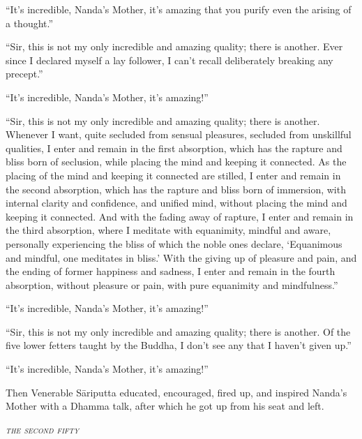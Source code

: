 \documentclass[12pt,openany]{book}%
\let\oldcontentsline\contentsline
\newcommand{\nopagecontentsline}[3]{\oldcontentsline{#1}{#2}{}}
\newcommand*{\pannasa}[1]{\clearpage\thispagestyle{empty}\begin{center}\vspace*{14em}\setstretch{.85}\huge\itshape\scshape\MakeLowercase{#1}\end{center}}
\begin{document}
“It’s incredible, Nanda’s Mother, it’s amazing that you purify even the arising of a thought.” 

“Sir, this is not my only incredible and amazing quality; there is another. Ever since I declared myself a lay follower, I can’t recall deliberately breaking any precept.” 

“It’s incredible, Nanda’s Mother, it’s amazing!” 

“Sir, this is not my only incredible and amazing quality; there is another. Whenever I want, quite secluded from sensual pleasures, secluded from unskillful qualities, I enter and remain in the first absorption, which has the rapture and bliss born of seclusion, while placing the mind and keeping it connected. As the placing of the mind and keeping it connected are stilled, I enter and remain in the second absorption, which has the rapture and bliss born of immersion, with internal clarity and confidence, and unified mind, without placing the mind and keeping it connected. And with the fading away of rapture, I enter and remain in the third absorption, where I meditate with equanimity, mindful and aware, personally experiencing the bliss of which the noble ones declare, ‘Equanimous and mindful, one meditates in bliss.’ With the giving up of pleasure and pain, and the ending of former happiness and sadness, I enter and remain in the fourth absorption, without pleasure or pain, with pure equanimity and mindfulness.” 

“It’s incredible, Nanda’s Mother, it’s amazing!” 

“Sir, this is not my only incredible and amazing quality; there is another. Of the five lower fetters taught by the Buddha, I don’t see any that I haven’t given up.” 

“It’s incredible, Nanda’s Mother, it’s amazing!” 

Then Venerable \textsanskrit{Sāriputta} educated, encouraged, fired up, and inspired Nanda’s Mother with a Dhamma talk, after which he got up from his seat and left. 

%
\pannasa{The Second Fifty }
\markboth{}{}
\addtocontents{toc}{\let\protect\contentsline\protect\oldcontentsline}

%
\end{document}
